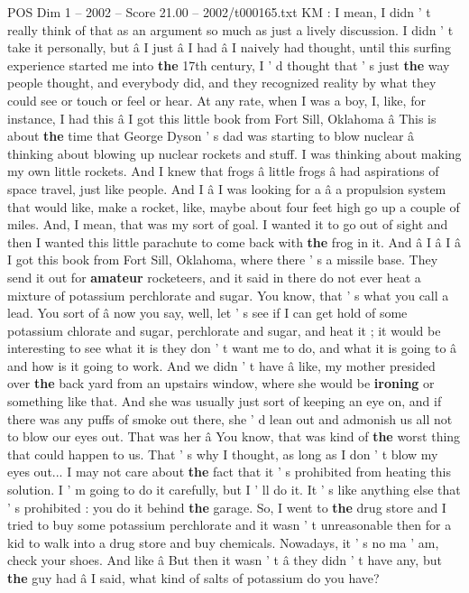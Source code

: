 \begin{textsample}{POS Dim 1 – 2002 – Score 21.00 – 2002/t000165.txt}
KM : I mean, I didn ' t really think of that as an argument so much as just a lively discussion.
I didn ' t take it personally, but â I just â I had â I naively had thought, until this surfing experience started me into \textbf{the} 17th century, I ' d thought that ' s just \textbf{the} way people thought, and everybody did, and they recognized reality by what they could see or touch or feel or hear.
At any rate, when I was a boy, I, like, for instance, I had this â I got this little book from Fort Sill, Oklahoma â This is about \textbf{the} time that George Dyson ' s dad was starting to blow nuclear â thinking about blowing up nuclear rockets and stuff.
I was thinking about making my own little rockets.
And I knew that frogs â little frogs â had aspirations of space travel, just like people.
And I â I was looking for a â a propulsion system that would like, make a rocket, like, maybe about four feet high go up a couple of miles.
And, I mean, that was my sort of goal.
I wanted it to go out of sight and then I wanted this little parachute to come back with \textbf{the} frog in it.
And â I â I â I got this book from Fort Sill, Oklahoma, where there ' s a missile base.
They send it out for \textbf{amateur} rocketeers, and it said in there do not ever heat a mixture of potassium perchlorate and sugar.
You know, that ' s what you call a lead.
You sort of â now you say, well, let ' s see if I can get hold of some potassium chlorate and sugar, perchlorate and sugar, and heat it ; it would be interesting to see what it is they don ' t want me to do, and what it is going to â and how is it going to work.
And we didn ' t have â like, my mother presided over \textbf{the} back yard from an upstairs window, where she would be \textbf{ironing} or something like that.
And she was usually just sort of keeping an eye on, and if there was any puffs of smoke out there, she ' d lean out and admonish us all not to blow our eyes out.
That was her â You know, that was kind of \textbf{the} worst thing that could happen to us.
That ' s why I thought, as long as I don ' t blow my eyes out...
I may not care about \textbf{the} fact that it ' s prohibited from heating this solution.
I ' m going to do it carefully, but I ' ll do it.
It ' s like anything else that ' s prohibited : you do it behind \textbf{the} garage.
So, I went to \textbf{the} drug store and I tried to buy some potassium perchlorate and it wasn ' t unreasonable then for a kid to walk into a drug store and buy chemicals.
Nowadays, it ' s no ma ' am, check your shoes.
And like â But then it wasn ' t â they didn ' t have any, but \textbf{the} guy had â I said, what kind of salts of potassium do you have?

\end{textsample}
